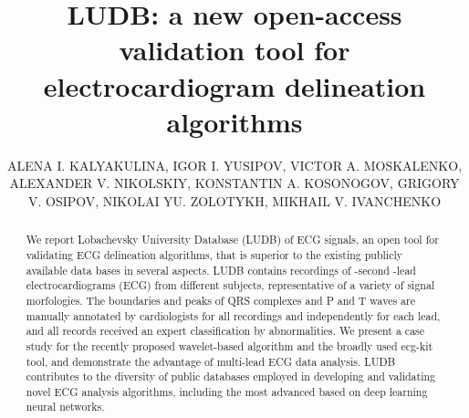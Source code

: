 \documentclass[submitted]{ieeeaccess}
\newcommand{\DeletedText}[1]{}
\newcommand{\NewCorrection}[1]{{#1}}
\begin{document}
    


\doi{}

\title{LUDB: a new open-access validation tool for electrocardiogram delineation algorithms}

\author{\uppercase{Alena I. Kalyakulina},
    \uppercase{Igor I. Yusipov},
    \uppercase{Victor A. Moskalenko},
    \uppercase{Alexander V. Nikolskiy},
    \uppercase{Konstantin A. Kosonogov},
    \uppercase{Grigory V. Osipov},
    \uppercase{Nikolai Yu. Zolotykh},
    \uppercase{Mikhail V. Ivanchenko}}

\address[1]{Institute of Information Technologies, Mathematics and Mechanics, Lobachevsky University, Nizhni
Novgorod, Russia}

\address[2]{Department of Cardiovascular Surgery, City Clinical Hospital No 5, Nizhni Novgorod, Russia}






\begin{abstract}
We report Lobachevsky University Database (LUDB) of ECG signals, \NewCorrection{an open tool for validating ECG delineation algorithms, that is superior to the existing publicly available data bases in several aspects. LUDB} contains  recordings of -second -lead electrocardiograms (ECG) from different subjects, \NewCorrection{representative of a variety of signal morfologies}. The boundaries and peaks of QRS \NewCorrection{complexes} and P and T waves are manually annotated by cardiologists for all recordings and independently for each lead, and all records received an expert classification by abnormalities. \DeletedText{In addition, the database is representative of a variety of signal morphologies. These features make LUDB a promising tool for validating ECG delineation algorithms across a broad range of ECG signal shapes and patient diagnoses.} \NewCorrection{We present} a case study for the recently proposed wavelet-based algorithm \DeletedText{is presented.} \NewCorrection{and the broadly used ecg-kit tool, and demonstrate the advantage of multi-lead ECG data analysis. LUDB contributes to the diversity of public databases employed in developing and validating novel ECG analysis algorithms, including the most advanced based on deep learning neural networks.}  
\end{abstract}
\end{document}
